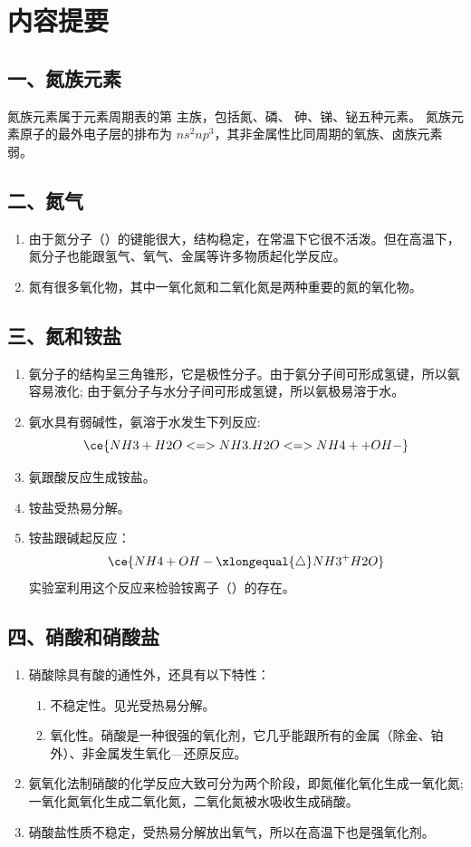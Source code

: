 \section*{内容提要}
\setcounter{subsection}{0}
\subsection*{一、氮族元素}
氮族元素属于元素周期表的第  主族，包括氮、磷、 砷、锑、铋五种元素。
氮族元素原子的最外电子层的排布为 $ns^2np^3$，其非金属性比同周期的氧族、卤族元素弱。
\subsection*{二、氮气}
\begin{enumerate}[1.]
  \item 由于氮分子（\:）的键能很大，结构稳定，在常温下它很不活泼。但在高温下，氮分子也能跟氢气、氧气、金属等许多物质起化学反应。
  \item 氮有很多氧化物，其中一氧化氮和二氧化氮是两种重要的氮的氧化物。
\end{enumerate}
\subsection*{三、氮和铵盐}
\begin{enumerate}[1.]
  \item 氨分子的结构呈三角锥形，它是极性分子。由于氨分子间可形成氢键，所以氨容易液化; 由于氨分子与水分子间可形成氢键，所以氨极易溶于水。
  \item 氨水具有弱碱性，氨溶于水发生下列反应:
  \[ \ce{NH3 + H2O <=> NH3.H2O <=> NH4+ +OH-} \]
  \item 氨跟酸反应生成铵盐。
  \item 铵盐受热易分解。
  \item 铵盐跟碱起反应：
  \[ \ce{ NH4+ OH- \xlongequal{\triangle} NH3 ^ + H2O } \]
  实验室利用这个反应来检验铵离子（）的存在。
\end{enumerate}
\subsection*{四、硝酸和硝酸盐}
\begin{enumerate}[1.]
  \item 硝酸除具有酸的通性外，还具有以下特性：
  \begin{enumerate}[(1)]
    \item 不稳定性。见光受热易分解。
    \item 氧化性。硝酸是一种很强的氧化剂，它几乎能跟所有的金属（除金、铂外）、非金属发生氧化—还原反应。
  \end{enumerate}
  \item 氨氧化法制硝酸的化学反应大致可分为两个阶段，即氮催化氧化生成一氧化氮; 一氧化氮氧化生成二氧化氮，二氧化氮被水吸收生成硝酸。
  \item 硝酸盐性质不稳定，受热易分解放出氧气，所以在高温下也是强氧化剂。
\end{enumerate}

